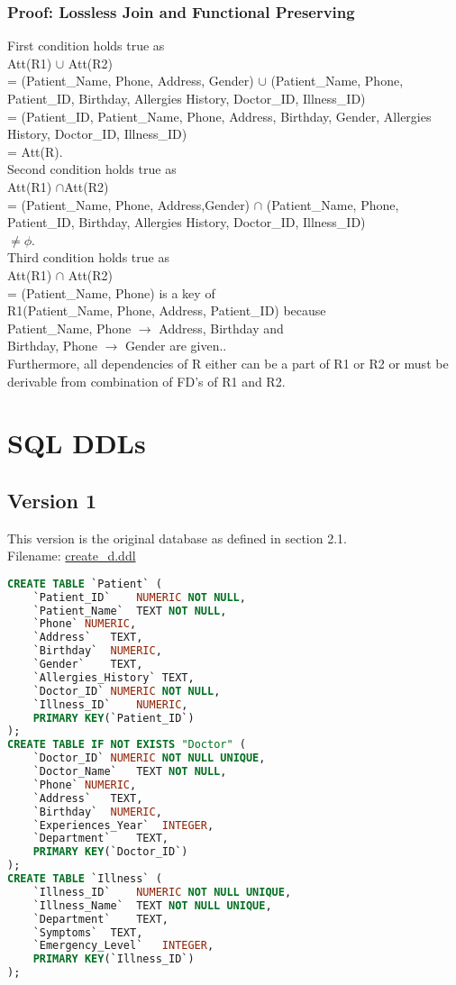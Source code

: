 \documentclass[12pt,arial]{article}
\begin{document}
\subsubsection{Proof: Lossless Join and Functional Preserving}
First condition holds true as \\Att(R1) $\cup$ Att(R2) \\= (Patient\_Name, Phone, Address, Gender) $\cup$ (Patient\_Name, Phone, Patient\_ID, Birthday, Allergies History, Doctor\_ID, Illness\_ID) \\= (Patient\_ID, Patient\_Name, Phone, Address, Birthday, Gender, Allergies History, Doctor\_ID, Illness\_ID)\\= Att(R).\\ \hfil \break
Second condition holds true as \\Att(R1) $\cap$Att(R2) \\= (Patient\_Name, Phone, Address,Gender) $\cap$ (Patient\_Name, Phone, Patient\_ID, Birthday, Allergies History, Doctor\_ID, Illness\_ID) \\$\neq \phi$.\\ \hfil \break
Third condition holds true as \\Att(R1) $\cap$ Att(R2) \\= (Patient\_Name, Phone) is a key of \\R1(Patient\_Name, Phone, Address, Patient\_ID) because \\Patient\_Name, Phone $\rightarrow$ Address, Birthday and \\Birthday, Phone $\rightarrow$ Gender are given..\\ \hfil \break
Furthermore, all dependencies of R either can be a part of R1 or R2 or must be derivable from combination of FD’s of R1 and R2.
\section{SQL DDLs}
\subsection{Version 1}
This version is the original database as defined in section 2.1.\\
Filename: \url{create_d.ddl}
\begin{lstlisting}[language=SQL]
	CREATE TABLE `Patient` (
	`Patient_ID`	NUMERIC NOT NULL,
	`Patient_Name`	TEXT NOT NULL,
	`Phone`	NUMERIC,
	`Address`	TEXT,
	`Birthday`	NUMERIC,
	`Gender`	TEXT,
	`Allergies_History`	TEXT,
	`Doctor_ID`	NUMERIC NOT NULL,
	`Illness_ID`	NUMERIC,
	PRIMARY KEY(`Patient_ID`)
);
CREATE TABLE IF NOT EXISTS "Doctor" (
	`Doctor_ID`	NUMERIC NOT NULL UNIQUE,
	`Doctor_Name`	TEXT NOT NULL,
	`Phone`	NUMERIC,
	`Address`	TEXT,
	`Birthday`	NUMERIC,
	`Experiences_Year`	INTEGER,
	`Department`	TEXT,
	PRIMARY KEY(`Doctor_ID`)
);
CREATE TABLE `Illness` (
	`Illness_ID`	NUMERIC NOT NULL UNIQUE,
	`Illness_Name`	TEXT NOT NULL UNIQUE,
	`Department`	TEXT,
	`Symptoms`	TEXT,
	`Emergency_Level`	INTEGER,
	PRIMARY KEY(`Illness_ID`)
);
\end{lstlisting}
\end{document}
